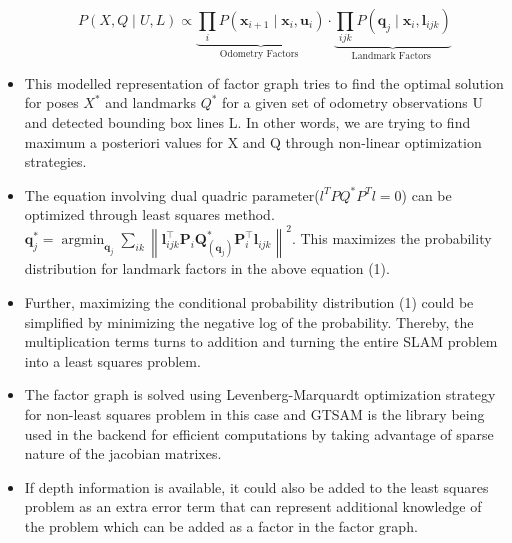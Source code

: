 \documentclass[report.tex]{subfiles}
\begin{document}
\begin{itemize}
\begin{equation}
{
P(X, Q \mid U, L) \propto \underbrace{\prod_{i} P\left(\mathbf{x}_{i+1} \mid \mathbf{x}_{i}, \mathbf{u}_{i}\right)}_{\text {Odometry Factors }} \cdot \underbrace{\prod_{i j k} P\left(\mathbf{q}_{j} \mid \mathbf{x}_{i}, \mathbf{l}_{i j k}\right)}_{\text {Landmark Factors }}
}
\end{equation}

\item This modelled representation of factor graph tries to find the optimal solution for poses $X^{*}$ and landmarks $Q^{*}$ for a given set of odometry observations U and detected bounding box lines L. In other words, we are trying to find maximum a posteriori values for X and Q through non-linear optimization strategies.

\item The equation involving dual quadric parameter($l^{T} P Q^{*} P^{T} l = 0$) can be optimized through least squares method. $\mathbf{q}_{j}^{*}=\operatorname{argmin}_{\mathbf{q}_{j}} \sum_{i k}\left\|\mathbf{l}_{i j k}^{\top} \mathbf{P}_{i} \mathbf{Q}_{\left(\mathbf{q}_{j}\right)}^{*} \mathbf{P}_{i}^{\top} \mathbf{l}_{i j k}\right\|^{2}$. This maximizes the probability distribution for landmark factors in the above equation (1).

\item Further, maximizing the conditional probability distribution (1) could be simplified by minimizing the negative log of the probability. Thereby, the multiplication terms turns to addition and turning the entire SLAM problem into a least squares problem.

\item The factor graph is solved using Levenberg-Marquardt optimization strategy for non-least squares problem in this case and GTSAM\cite{gtsam} is the library being used in the backend for efficient computations by taking advantage of sparse nature of the jacobian matrixes.

\item If depth information is available, it could also be added to the least squares problem as an extra error term that can represent additional knowledge of the problem which can be added as a factor in the factor graph.


\end{itemize}
\end{document}
